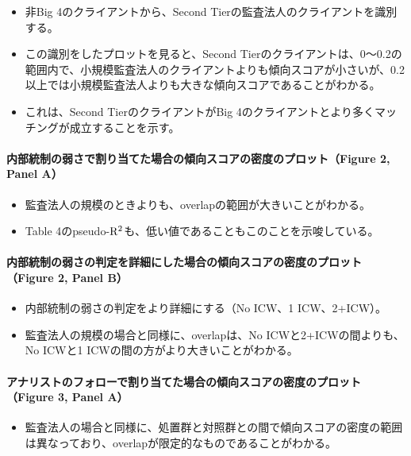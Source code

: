 \begin{itemize}
 \item 非Big 4のクライアントから、Second Tierの監査法人のクライアントを識別する。
 \item この識別をしたプロットを見ると、Second Tierのクライアントは、0〜0.2の範囲内で、小規模監査法人のクライアントよりも傾向スコアが小さいが、0.2以上では小規模監査法人よりも大きな傾向スコアであることがわかる。
 \item これは、Second TierのクライアントがBig 4のクライアントとより多くマッチングが成立することを示す。
\end{itemize}

\paragraph{内部統制の弱さで割り当てた場合の傾向スコアの密度のプロット（Figure 2, Panel A）}

\begin{itemize}
 \item 監査法人の規模のときよりも、overlapの範囲が大きいことがわかる。
 \item Table 4のpseudo-${\rm R^2}$も、低い値であることもこのことを示唆している。
\end{itemize}

\paragraph{内部統制の弱さの判定を詳細にした場合の傾向スコアの密度のプロット（Figure 2, Panel B）}

\begin{itemize}
 \item 内部統制の弱さの判定をより詳細にする（No ICW、1 ICW、2+ICW）。
 \item 監査法人の規模の場合と同様に、overlapは、No ICWと2+ICWの間よりも、No ICWと1 ICWの間の方がより大きいことがわかる。
\end{itemize}

\paragraph{アナリストのフォローで割り当てた場合の傾向スコアの密度のプロット（Figure 3, Panel A）}

\begin{itemize}
 \item 監査法人の場合と同様に、処置群と対照群との間で傾向スコアの密度の範囲は異なっており、overlapが限定的なものであることがわかる。
\end{itemize}

